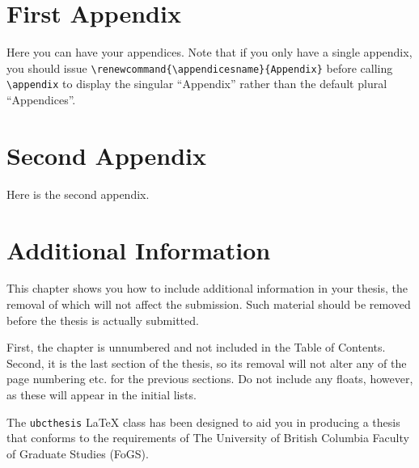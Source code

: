 \documentclass[msc,oneside]{ubcthesis}
\theoremstyle{definition}
\begin{document}




\appendix
\chapter{First Appendix}
Here you can have your appendices.  Note that if you only have a
single appendix, you should issue
\verb|\renewcommand{\appendicesname}{Appendix}| before calling
\verb|\appendix| to display the singular ``Appendix'' rather than the
default plural ``Appendices''.

\chapter{Second Appendix}
Here is the second appendix.

\backmatter


\chapter*{Additional Information}
This chapter shows you how to include additional information in your
thesis, the removal of which will not affect the submission.  Such
material should be removed before the thesis is actually submitted.

First, the chapter is unnumbered and not included in the Table of
Contents.  Second, it is the last section of the thesis, so its
removal will not alter any of the page numbering etc. for the previous
sections.  Do not include any floats, however, as these will appear in
the initial lists.

The \texttt{ubcthesis} \LaTeX{} class has been designed to aid you in
producing a thesis that conforms to the requirements of The
University of British Columbia Faculty of Graduate Studies (FoGS).
\end{document}
